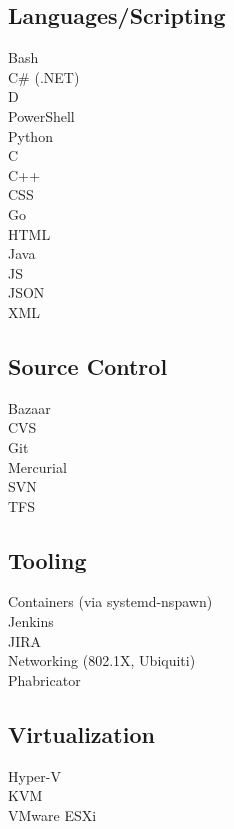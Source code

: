\documentclass[]{deedy-resume-openfont}
\begin{document}
\begin{minipage}[t]{0.33\textwidth}
\subsection{Languages/Scripting}
\textbullet{} Bash \\
\textbullet{} C\# (.NET) \\
\textbullet{} D \\
\textbullet{} PowerShell \\
\textbullet{} Python \\
\textbullet{} C \\
\textbullet{} C++ \\
\textbullet{} CSS \\
\textbullet{} Go \\
\textbullet{} HTML \\
\textbullet{} Java \\
\textbullet{} JS \\
\textbullet{} JSON \\
\textbullet{} XML
\sectionsep

\subsection{Source Control}
\textbullet{} Bazaar \\
\textbullet{} CVS \\
\textbullet{} Git \\
\textbullet{} Mercurial \\
\textbullet{} SVN \\
\textbullet{} TFS
\sectionsep

\subsection{Tooling}
\textbullet{} Containers (via systemd-nspawn) \\
\textbullet{} Jenkins \\
\textbullet{} JIRA \\
\textbullet{} Networking (802.1X, Ubiquiti) \\
\textbullet{} Phabricator
\sectionsep

\subsection{Virtualization}
\textbullet{} Hyper-V \\
\textbullet{} KVM \\
\textbullet{} VMware ESXi
\sectionsep

%
%

\end{minipage}
\end{document}

